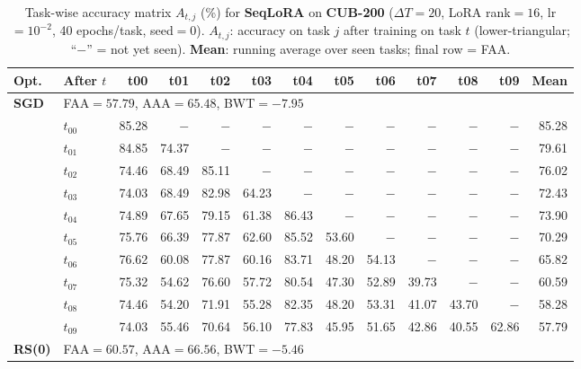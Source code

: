 
\begin{table}[ht]
\centering
\caption{%
  Task-wise accuracy matrix $A_{t,j}$ (\%) for \textbf{SeqLoRA} on \textbf{CUB-200} ($\Delta T=20$, LoRA rank$=16$, lr$=10^{-2}$, 40 epochs/task, seed$=0$).
  $A_{t,j}$: accuracy on task $j$ after training on task $t$  (lower-triangular; ``$-$'' = not yet seen).
  \textbf{Mean}: running average over seen tasks; final row = FAA.
}
\label{tab:raw_seqlora_cub200}
\setlength{\tabcolsep}{2.8pt}
\renewcommand{\arraystretch}{0.88}
\scriptsize
\begin{tabular}{@{}l l r r r r r r r r r r r@{}}
\toprule
\textbf{Opt.} & \textbf{After $t$} & \textbf{t00} & \textbf{t01} & \textbf{t02} & \textbf{t03} & \textbf{t04} & \textbf{t05} & \textbf{t06} & \textbf{t07} & \textbf{t08} & \textbf{t09} & \textbf{Mean} \\
\midrule
\multirow{11}{*}{\textbf{SGD}} & \multicolumn{12}{l}{\quad\small FAA$=57.79$,\; AAA$=65.48$,\; BWT$=-7.95$} \\
 & $t_{00}$ & 85.28 & $-$ & $-$ & $-$ & $-$ & $-$ & $-$ & $-$ & $-$ & $-$ & 85.28 \\
 & $t_{01}$ & 84.85 & 74.37 & $-$ & $-$ & $-$ & $-$ & $-$ & $-$ & $-$ & $-$ & 79.61 \\
 & $t_{02}$ & 74.46 & 68.49 & 85.11 & $-$ & $-$ & $-$ & $-$ & $-$ & $-$ & $-$ & 76.02 \\
 & $t_{03}$ & 74.03 & 68.49 & 82.98 & 64.23 & $-$ & $-$ & $-$ & $-$ & $-$ & $-$ & 72.43 \\
 & $t_{04}$ & 74.89 & 67.65 & 79.15 & 61.38 & 86.43 & $-$ & $-$ & $-$ & $-$ & $-$ & 73.90 \\
 & $t_{05}$ & 75.76 & 66.39 & 77.87 & 62.60 & 85.52 & 53.60 & $-$ & $-$ & $-$ & $-$ & 70.29 \\
 & $t_{06}$ & 76.62 & 60.08 & 77.87 & 60.16 & 83.71 & 48.20 & 54.13 & $-$ & $-$ & $-$ & 65.82 \\
 & $t_{07}$ & 75.32 & 54.62 & 76.60 & 57.72 & 80.54 & 47.30 & 52.89 & 39.73 & $-$ & $-$ & 60.59 \\
 & $t_{08}$ & 74.46 & 54.20 & 71.91 & 55.28 & 82.35 & 48.20 & 53.31 & 41.07 & 43.70 & $-$ & 58.28 \\
 & $t_{09}$ & 74.03 & 55.46 & 70.64 & 56.10 & 77.83 & 45.95 & 51.65 & 42.86 & 40.55 & 62.86 & 57.79 \\
\midrule
\multirow{11}{*}{\textbf{RS(0)}} & \multicolumn{12}{l}{\quad\small FAA$=60.57$,\; AAA$=66.56$,\; BWT$=-5.46$} \\

\end{tabular}
\end{table}

